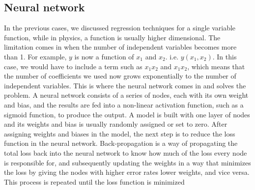 \documentclass[aps,prb,twocolumn,superscriptaddress,floatfix]{revtex4-2}
\begin{document}
\subsection{Neural network}
In the previous cases, we discussed regression techniques for a single variable function, while in physics, a function is usually higher dimensional. The limitation comes in when the number of independent variables becomes more than 1. For example, $y$ is now a function of $x_1$ and $x_2$. i.e. $y(x_1,x_2)$.
In this case, we would have to include a term such as $x_1x_2$ and $x_1x_2$, which means that the number of coefficients we used now grows exponentially to the number of independent variables. This is where the neural network comes in and solves the problem. A neural network consists of a series of nodes, each with its own weight and bias, and the results are fed into a non-linear activation function, such as a sigmoid function, to produce the output.
A model is built with one layer of nodes and its weights and bias is usually randomly assigned or set to zero.
After assigning weights and biases in the model, the next step is to reduce the loss function in the neural network. Back-propagation is a way of propagating the total loss back into the neural network to know how much of the loss every node is responsible for, and subsequently updating the weights in a way that minimizes the loss by giving the nodes with higher error rates lower weights, and vice versa. This process is repeated until the loss function is minimized
\end{document}
